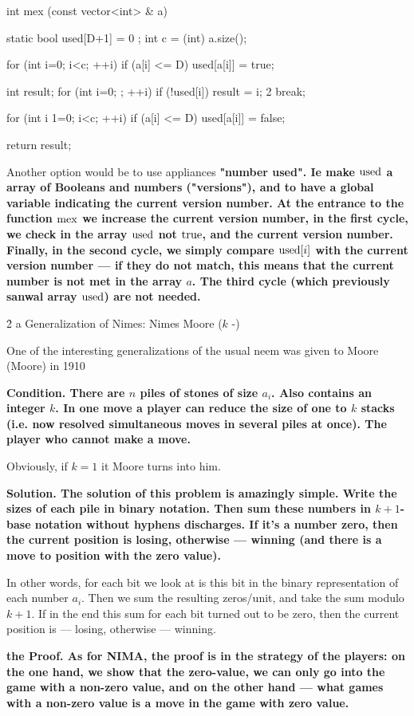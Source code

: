 \code
int mex (const vector<int> & a) {
static bool used[D+1] = { 0 };
int c = (int) a.size();

for (int i=0; i<c; ++i)
if (a[i] <= D)
used[a[i]] = true;

int result;
for (int i=0; ; ++i)
if (!used[i]) {
result = i;
2 break;
}

for (int i 1=0; i<c; ++i)
if (a[i] <= D)
used[a[i]] = false;

return result;
}
\endcode

Another option would be to use appliances \bf{"number used"}. Ie make $\rm used$ a array of Booleans and numbers ("versions"), and to have a global variable indicating the current version number. At the entrance to the function $\rm mex$ we increase the current version number, in the first cycle, we check in the array $\rm used$ not $\rm true$, and the current version number. Finally, in the second cycle, we simply compare ${\rm used}[i]$ with the current version number --- if they do not match, this means that the current number is not met in the array $a$. The third cycle (which previously sanwal array $\rm used$) are not needed.


\h2{ a Generalization of Nimes: Nimes Moore ($k$ -) }

One of the interesting generalizations of the usual neem was given to Moore (Moore) in 1910

\bf{Condition}. There are $n$ piles of stones of size $a_i$. Also contains an integer $k$. In one move a player can reduce the size of one to $k$ stacks (i.e. now resolved simultaneous moves in several piles at once). The player who cannot make a move.

Obviously, if $k=1$ it Moore turns into him.

\bf{Solution}. The solution of this problem is amazingly simple. Write the sizes of each pile in binary notation. Then sum these numbers in $k+1$-base notation without hyphens discharges. If it's a number zero, then the current position is losing, otherwise --- winning (and there is a move to position with the zero value).

In other words, for each bit we look at is this bit in the binary representation of each number $a_i$. Then we sum the resulting zeros/unit, and take the sum modulo $k+1$. If in the end this sum for each bit turned out to be zero, then the current position is --- losing, otherwise --- winning.

\bf{the Proof}. As for NIMA, the proof is in the strategy of the players: on the one hand, we show that the zero-value, we can only go into the game with a non-zero value, and on the other hand --- what games with a non-zero value is a move in the game with zero value.

